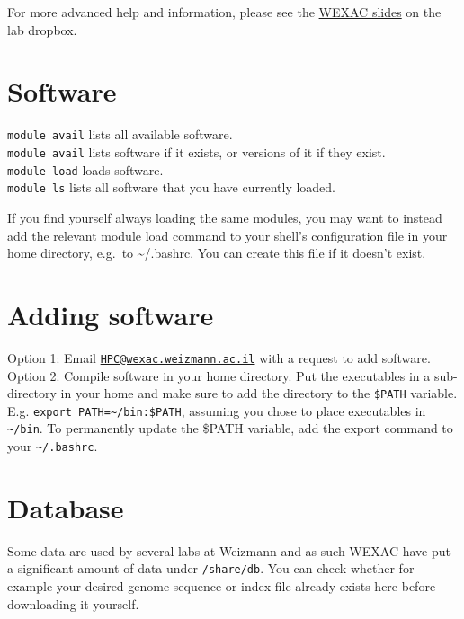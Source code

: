 \documentclass[
]{book}
\begin{document}
For more advanced help and information, please see the \href{https://www.dropbox.com/s/uuv6qrkrwlhytrm/wexac_introduction.pdf?dl=0}{WEXAC slides} on the lab dropbox.

\hypertarget{software}{%
\section{Software}\label{software}}

\texttt{module\ avail} lists all available software.\\
\texttt{module\ avail} lists software if it exists, or versions of it if they exist.\\
\texttt{module\ load} loads software.\\
\texttt{module\ ls} lists all software that you have currently loaded.

If you find yourself always loading the same modules, you may want to instead add the relevant module load command to your shell's configuration file in your home directory, e.g.~to \textasciitilde/.bashrc. You can create this file if it doesn't exist.

\hypertarget{adding-software}{%
\section{Adding software}\label{adding-software}}

Option 1: Email \href{mailto:HPC@wexac.weizmann.ac.il}{\nolinkurl{HPC@wexac.weizmann.ac.il}} with a request to add software.\\
Option 2: Compile software in your home directory. Put the executables in a sub-directory in your home and make sure to add the directory to the \texttt{\$PATH} variable. E.g. \texttt{export\ PATH=\textasciitilde{}/bin:\$PATH}, assuming you chose to place executables in \texttt{\textasciitilde{}/bin}. To permanently update the \$PATH variable, add the export command to your \texttt{\textasciitilde{}/.bashrc}.

\hypertarget{database}{%
\section{Database}\label{database}}

Some data are used by several labs at Weizmann and as such WEXAC have put a significant amount of data under \texttt{/share/db}. You can check whether for example your desired genome sequence or index file already exists here before downloading it yourself.
\end{document}
